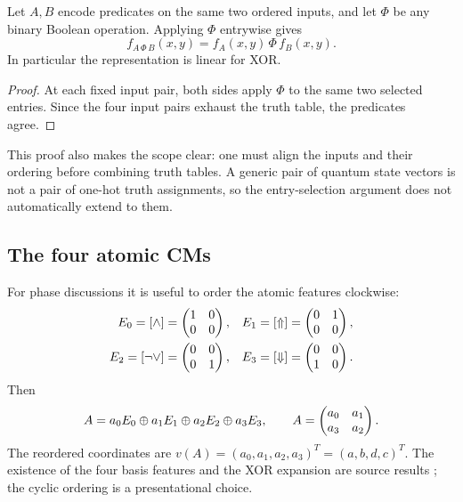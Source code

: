\begin{proposition}\label{prop:pointwise}
Let $A,B$ encode predicates on the same two ordered inputs, and let $\Phi$ be any binary Boolean operation. Applying $\Phi$ entrywise gives
\begin{equation}
 f_{A\,\Phi\,B}(x,y)=f_A(x,y)\,\Phi\,f_B(x,y).
\end{equation}
In particular the representation is linear for XOR.
\end{proposition}
\begin{proof}
At each fixed input pair, both sides apply $\Phi$ to the same two selected entries. Since the four input pairs exhaust the truth table, the predicates agree.
\end{proof}
This proof also makes the scope clear: one must align the inputs and their ordering before combining truth tables. A generic pair of quantum state vectors is not a pair of one-hot truth assignments, so the entry-selection argument does not automatically extend to them.

\subsection{The four atomic CMs}
For phase discussions it is useful to order the atomic features clockwise:
\begin{align}
 E_0=[\land]&=\begin{pmatrix}1&0\\0&0\end{pmatrix},& E_1=[\Uparrow]&=\begin{pmatrix}0&1\\0&0\end{pmatrix},\\
 E_2=[\neg\lor]&=\begin{pmatrix}0&0\\0&1\end{pmatrix},& E_3=[\Downarrow]&=\begin{pmatrix}0&0\\1&0\end{pmatrix}.
\end{align}
Then
\begin{equation}
 A=a_0E_0\oplus a_1E_1\oplus a_2E_2\oplus a_3E_3,
 \qquad A=\begin{pmatrix}a_0&a_1\\a_3&a_2\end{pmatrix}.
\end{equation}
The reordered coordinates are $v(A)=(a_0,a_1,a_2,a_3)^T=(a,b,d,c)^T$. The existence of the four basis features and the XOR expansion are source results \cite[Figure 1 and Section 3.2.1]{droncheff}; the cyclic ordering is a presentational choice.

